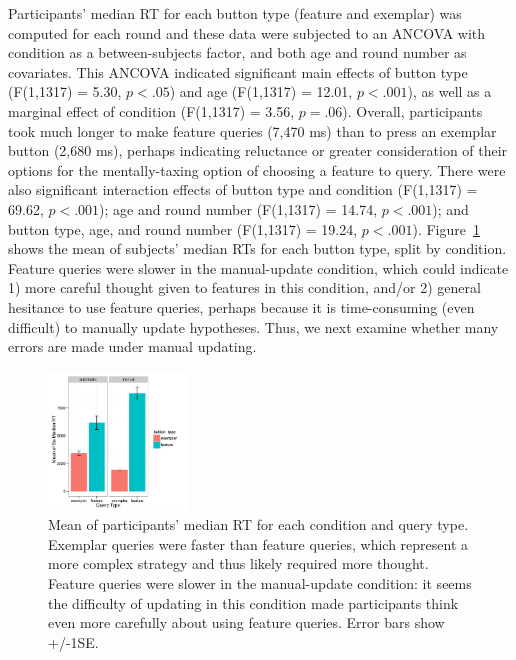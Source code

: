 \documentclass[10pt,letterpaper]{article}
\begin{document}
Participants' median RT for each button type (feature and exemplar) was computed 
for each round and these data were subjected to an ANCOVA with condition as a 
between-subjects factor, and both age and round number as covariates. This 
ANCOVA indicated significant main effects of button type (F(1,1317) = 5.30, $p<.
05$) and age (F(1,1317) = 12.01, $p<.001$), as well as a marginal effect of 
condition (F(1,1317) = 3.56, $p = .06$). Overall, participants took much longer to 
make feature queries (7,470 ms) than to press an exemplar button (2,680 ms), 
perhaps indicating reluctance or greater consideration of their options for the 
mentally-taxing option of choosing a feature to query. There were also significant 
interaction effects of button type and condition (F(1,1317) = 69.62, $p<.001$); age 
and round number (F(1,1317) = 14.74, $p<.001$); and button type, age, and round 
number (F(1,1317) = 19.24, $p<.001$). Figure~\ref{fig:basic-rt} shows the mean of 
subjects' median RTs for each button type, split by condition. Feature queries were 
slower in the manual-update condition, which could indicate 1) more careful thought 
given to features in this condition, and/or 2) general hesitance to use feature 
queries, perhaps because it is time-consuming (even difficult) to manually update 
hypotheses. Thus, we next examine whether many errors are made under manual 
updating.

\begin{figure}[h]
  \centering
  \includegraphics[width=0.33\textwidth]{figures/RT_by_condition_query_type}
  \caption{Mean of participants' median RT for each condition and query type. 
Exemplar queries were faster than feature queries, which represent a more complex 
strategy and thus likely required more thought. Feature queries were slower in the 
manual-update condition: it seems the difficulty of updating in this condition made 
participants think even more carefully about using feature queries. Error bars show 
+/-1SE.}
  \label{fig:basic-rt}
\end{figure} 
\end{document}

